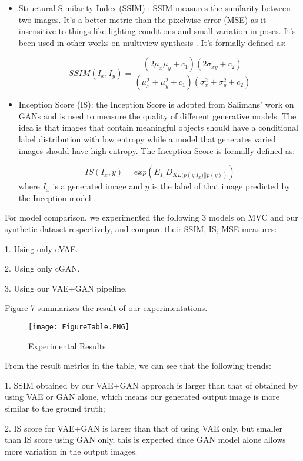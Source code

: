 \documentclass[10pt,conference]{IEEEtran}
\begin{document}
\begin{itemize}
\item Structural Similarity Index (SSIM) \autocite{wang2004image}: SSIM measures the similarity between two images. It's a better metric than the pixelwise error (MSE) as it insensitive to things like lighting conditions and small variation in poses. It's been used in other works on multiview synthesis \autocite{park2017transformation, zhao2017multi}. It's formally defined as:

$$SSIM(I_x,I_y)=\frac{(2\mu_x \mu_y + c_1)(2\sigma_{xy}+c_2)}{(\mu_x^2+\mu_y^2 +c_1)(\sigma_x^2+\sigma_y^2+c_2)}$$

\item Inception Score (IS): the Inception Score is adopted from Salimans' work on GANs \autocite{salimans2016improved} and is used to measure the quality of different generative models. The idea is that images that contain meaningful objects should have a conditional label distribution with low entropy while a model that generates varied images should have high entropy. The Inception Score is formally defined as:

$$IS(I_x, y)=exp(E_{I_x}D_{KL(p(y|I_x) || p(y))})$$
where $I_x$ is a generated image and $y$ is the label of that image predicted by the Inception model \autocite{szegedy2015going}.

\end{itemize}

For model comparison, we experimented the following 3 models on MVC and our synthetic dataset respectively, and compare their SSIM, IS, MSE measures:

1. Using only cVAE.

2. Using only cGAN.

3. Using our VAE+GAN pipeline.

Figure 7 summarizes the result of our experimentations.
\begin{figure*}
  \texttt{[image: FigureTable.PNG]}
  \caption{Experimental Results}
  \label{fig:boat1}
\end{figure*}

From the result metrics in the table, we can see that the following trends: 

1. SSIM obtained by our VAE+GAN approach is larger than that of obtained by using VAE or GAN alone, which means our generated output image is more similar to the ground truth; 

2. IS score for VAE+GAN is larger than that of using VAE only, but smaller than IS score using GAN only, this is expected since GAN model alone allows more variation in the output images. 
\end{document}
